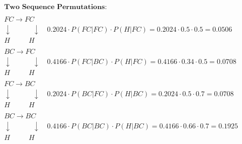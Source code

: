\documentclass[a4paper]{article}
\begin{document}
\begin{sloppypar}
\begin{enumerate}[start=6,label=Q\arabic*,left=0pt]
    \begin{align*}
        & \textbf{Two Sequence Permutations}: \\\\
        & FC \rightarrow FC \\
        & \downarrow \quad \quad \quad \downarrow \quad 0.2024 \cdot P(FC | FC) \cdot P(H | FC) = 0.2024 \cdot 0.5 \cdot 0.5 = 0.0506 \\
        & H \quad \quad \:\:\: H \\\\
        & BC \rightarrow FC \\
        & \downarrow \quad \quad \quad \downarrow \quad 0.4166 \cdot P(FC | BC) \cdot P(H | FC) = 0.4166 \cdot 0.34 \cdot 0.5 = 0.0708 \\
        & H \quad \quad \:\:\: H \\\\
        & FC \rightarrow BC  \\
        & \downarrow \quad \quad \quad \downarrow \quad 0.2024 \cdot P(BC | FC) \cdot P(H | BC) = 0.2024 \cdot 0.5 \cdot 0.7 = 0.0708 \\
        & H \quad \quad \:\:\: H \\\\
        & BC \rightarrow BC \\
        & \downarrow \quad \quad \quad \downarrow \quad 0.4166 \cdot P(BC | BC) \cdot P(H | BC) = 0.4166 \cdot 0.66 \cdot 0.7 = 0.1925 \\
        & H \quad \quad \:\:\: H
    \end{align*}


\end{enumerate}
\end{sloppypar}
\end{document}
